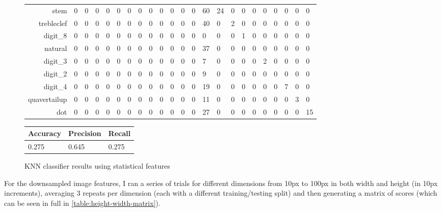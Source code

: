 \begin{figure}
\begin{subtable}[b]{\linewidth}
\begin{tabularx}{\textwidth}{r|XXXXXXXXXXXXXXXXXXXXXX}
    stem & 0 & 0 & 0 & 0 & 0 & 0 & 0 & 0 & 0 & 0 & 0 & 0 & 60 & 24 & 0 & 0 & 0 & 0 & 0 & 0 & 0 & 0 \\
    trebleclef & 0 & 0 & 0 & 0 & 0 & 0 & 0 & 0 & 0 & 0 & 0 & 0 & 40 & 0 & 2 & 0 & 0 & 0 & 0 & 0 & 0 & 0 \\
    digit\_8 & 0 & 0 & 0 & 0 & 0 & 0 & 0 & 0 & 0 & 0 & 0 & 0 & 0 & 0 & 0 & 1 & 0 & 0 & 0 & 0 & 0 & 0 \\
    natural & 0 & 0 & 0 & 0 & 0 & 0 & 0 & 0 & 0 & 0 & 0 & 0 & 37 & 0 & 0 & 0 & 0 & 0 & 0 & 0 & 0 & 0 \\
    digit\_3 & 0 & 0 & 0 & 0 & 0 & 0 & 0 & 0 & 0 & 0 & 0 & 0 & 7 & 0 & 0 & 0 & 0 & 2 & 0 & 0 & 0 & 0 \\
    digit\_2 & 0 & 0 & 0 & 0 & 0 & 0 & 0 & 0 & 0 & 0 & 0 & 0 & 9 & 0 & 0 & 0 & 0 & 0 & 0 & 0 & 0 & 0 \\
    digit\_4 & 0 & 0 & 0 & 0 & 0 & 0 & 0 & 0 & 0 & 0 & 0 & 0 & 19 & 0 & 0 & 0 & 0 & 0 & 0 & 7 & 0 & 0 \\
    quavertailup & 0 & 0 & 0 & 0 & 0 & 0 & 0 & 0 & 0 & 0 & 0 & 0 & 11 & 0 & 0 & 0 & 0 & 0 & 0 & 0 & 3 & 0 \\
    dot & 0 & 0 & 0 & 0 & 0 & 0 & 0 & 0 & 0 & 0 & 0 & 0 & 27 & 0 & 0 & 0 & 0 & 0 & 0 & 0 & 0 & 15 \\
    \end{tabularx}
  \end{subtable}

  \vspace{0.8cm}

  \begin{subtable}[b]{.4\linewidth}
    \begin{tabularx}{\linewidth}{lll}
      \toprule
      Accuracy & Precision & Recall \\
      \midrule
      0.275 & 0.645 & 0.275 \\
      \bottomrule
    \end{tabularx}
  \end{subtable}
  
  \caption{KNN classifier results using statistical features}
\end{figure}

For the downsampled image features, I ran a series of trials for different dimensions from 10px to 100px in both width and height (in 10px increments), averaging 3 repeats per dimension (each with a different training/testing split) and then generating a matrix of scores (which can be seen in full in \cref{table:height-width-matrix}).

